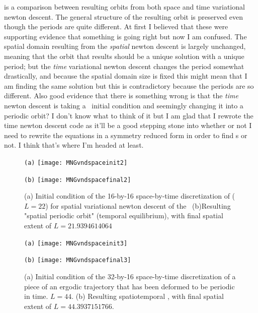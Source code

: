  is a comparison between resulting orbits from both space and time variational {newton descent}.
The general structure of the resulting orbit is preserved even though the periods are quite different. At first I believed that
these were supporting evidence that something is going right but now I am confused. The spatial domain resulting from the \emph{spatial}
{newton descent} is largely unchanged, meaning that the orbit that results should be a unique solution with a unique period; but the \emph{time}
variational {newton descent} changes the period somewhat drastically, and because the spatial domain size is fixed this might mean that I am
finding the same solution but this is contradictory because the periods are so different. Also good evidence that there is something wrong is that
the \emph{time} {newton descent} is taking a \rpo\ initial condition and seemingly changing it into a periodic orbit? I don't know what
to think of it but I am glad that I rewrote the time {newton descent} code as it'll be a good stepping stone into whether or not I need to rewrite the equations
in a symmetry reduced form in order to find {\rpo}s or not. I think that's where I'm headed at least.


\begin{figure}[ht]
\begin{minipage}[height=.32\textheight]{.45\textwidth}
\centering \small{\texttt{(a)}}
\texttt{[image: MNGvndspaceinit2]}
\end{minipage}
\begin{minipage}[height=.32\textheight]{.45\textwidth}
\centering \small{\texttt{(b)}}
\texttt{[image: MNGvndspacefinal2]}
\end{minipage}
\caption{ \label{fig:MNGvndspace2}
(a) Initial condition of the 16-by-16 space-by-time discretization of  ($L=22$) for spatial
variational {newton descent} of the \KSe\ (b)Resulting "spatial periodic orbit" (temporal equilibrium), with
final spatial extent of $L = 21.9394614064$
}
\end{figure}
\begin{figure}[ht]
\begin{minipage}[height=.32\textheight]{.45\textwidth}
\centering \small{\texttt{(a)}}
\texttt{[image: MNGvndspaceinit3]}
\end{minipage}
\begin{minipage}[height=.32\textheight]{.45\textwidth}
\centering \small{\texttt{(b)}}
\texttt{[image: MNGvndspacefinal3]}
\end{minipage}
\caption{ \label{fig:MNGvndspace3}
(a) Initial condition of the 32-by-16 space-by-time discretization of a piece
of an ergodic trajectory that has been deformed to be periodic in time. $L=44$.
(b) Resulting spatiotemporal \po, with
final spatial extent of $L = 44.3937151766$.
}
\end{figure}


